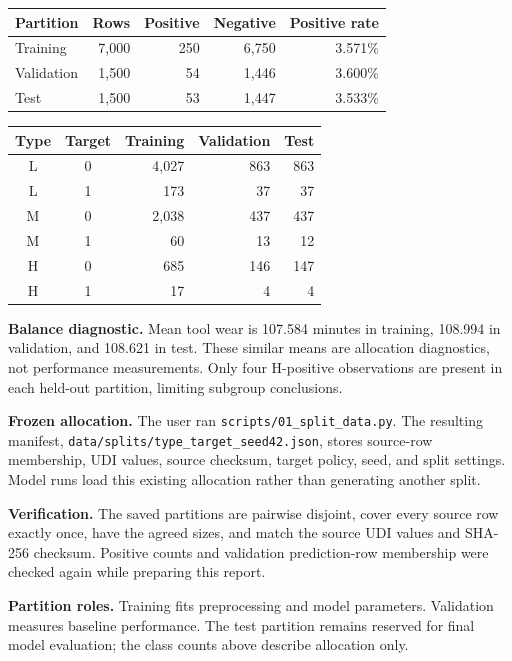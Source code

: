 \documentclass[11pt,a4paper]{article}
\newcommand{\filepath}[1]{\nolinkurl{#1}}
\begin{document}
\begin{center}
\begin{tabular}{lrrrr}
\toprule
Partition & Rows & Positive & Negative & Positive rate \\
\midrule
Training & 7,000 & 250 & 6,750 & 3.571\% \\
Validation & 1,500 & 54 & 1,446 & 3.600\% \\
Test & 1,500 & 53 & 1,447 & 3.533\% \\
\bottomrule
\end{tabular}
\end{center}

\begin{center}
\begin{tabular}{ccrrr}
\toprule
Type & Target & Training & Validation & Test \\
\midrule
L & 0 & 4,027 & 863 & 863 \\
L & 1 & 173 & 37 & 37 \\
M & 0 & 2,038 & 437 & 437 \\
M & 1 & 60 & 13 & 12 \\
H & 0 & 685 & 146 & 147 \\
H & 1 & 17 & 4 & 4 \\
\bottomrule
\end{tabular}
\end{center}

\textbf{Balance diagnostic.} Mean tool wear is 107.584 minutes in training,
108.994 in validation, and 108.621 in test. These similar means are allocation
diagnostics, not performance measurements. Only four H-positive observations
are present in each held-out partition, limiting subgroup conclusions.

\textbf{Frozen allocation.} The user ran
\filepath{scripts/01_split_data.py}. The resulting manifest,
\filepath{data/splits/type_target_seed42.json}, stores source-row membership,
UDI values, source checksum, target policy, seed, and split settings. Model
runs load this existing allocation rather than generating another split.

\textbf{Verification.} The saved partitions are pairwise disjoint, cover every
source row exactly once, have the agreed sizes, and match the source UDI
values and SHA-256 checksum. Positive counts and validation prediction-row
membership were checked again while preparing this report.

\textbf{Partition roles.} Training fits preprocessing and model parameters.
Validation measures baseline performance. The test partition remains reserved
for final model evaluation; the class counts above describe allocation only.
\end{document}
